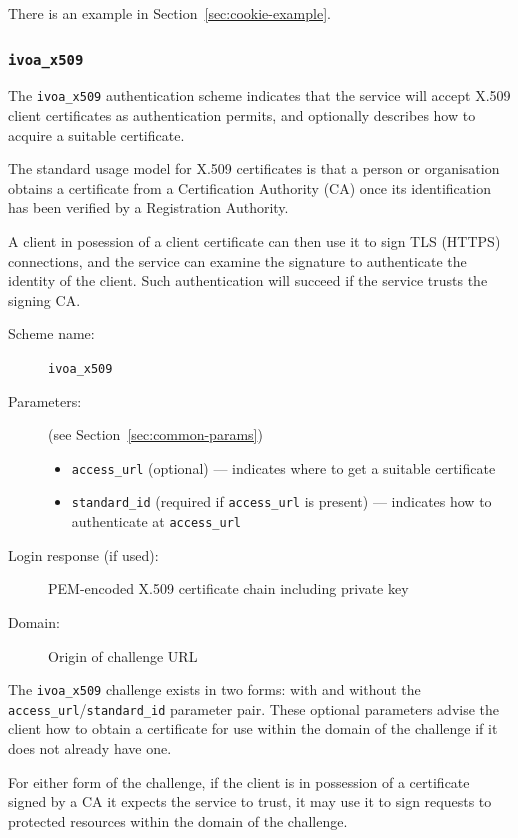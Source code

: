 \documentclass[11pt,a4paper]{ivoa}
\begin{document}
There is an example in Section~\ref{sec:cookie-example}.


\subsubsection{\mbox{\tt ivoa\_x509}}\label{sec:ivoa-x509}

The \verb|ivoa_x509| authentication scheme indicates that the service
will accept X.509 client certificates as authentication permits,
and optionally describes how to acquire a suitable certificate.

The standard usage model for X.509 certificates is that 
a person or organisation obtains a certificate from a
Certification Authority (CA) once its identification has
been verified by a Registration Authority.

A client in posession of a client certificate can then use it to
sign TLS (HTTPS) connections, and the service can examine the signature
to authenticate the identity of the client.
Such authentication will succeed if the service trusts the signing CA.

\begin{description}
  \item[Scheme name:] \verb|ivoa_x509|
  \item[Parameters:] (see Section~\ref{sec:common-params})
  \begin{itemize}
    \item \verb|access_url| (optional) ---
          indicates where to get a suitable certificate
    \item \verb|standard_id| (required if \verb|access_url| is present) ---
          indicates how to authenticate at \verb|access_url|
  \end{itemize}
  \item[Login response (if used):] PEM-encoded X.509 certificate chain
                                   including private key
  \item[Domain:] Origin of challenge URL
\end{description}

The \verb|ivoa_x509| challenge exists in two forms:
with and without the \verb|access_url|/\verb|standard_id| parameter pair.
These optional parameters advise the client how to obtain a certificate
for use within the domain of the challenge if it does not already have one.

For either form of the challenge,
if the client is in possession of a certificate
signed by a CA it expects the service to trust, it may use it to
sign requests to protected resources within the domain of the challenge.
\end{document}
